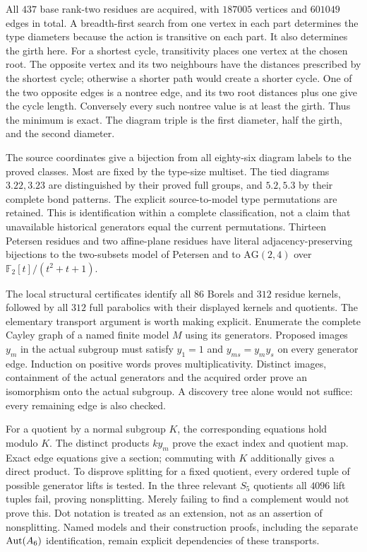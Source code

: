 All $437$ base rank-two residues are acquired, with $187005$ vertices
and $601049$ edges in total. A breadth-first search from one vertex in
each part determines the type diameters because the action is transitive
on each part. It also determines the girth here. For a shortest cycle,
transitivity places one vertex at the chosen root. The opposite vertex
and its two neighbours have the distances prescribed by the shortest
cycle; otherwise a shorter path would create a shorter cycle. One of
the two opposite edges is a nontree edge, and its two root distances
plus one give the cycle length. Conversely every such nontree value
is at least the girth. Thus the minimum is exact. The diagram triple
is the first diameter, half the girth, and the second diameter.

The source coordinates give a bijection from all eighty-six diagram
labels to the proved classes. Most are fixed by the type-size multiset.
The tied diagrams $3.22,3.23$ are distinguished by their proved full
groups, and $5.2,5.3$ by their complete bond patterns. The explicit
source-to-model type permutations are retained. This is identification
within a complete classification, not a claim that unavailable historical
generators equal the current permutations. Thirteen Petersen residues
and two affine-plane residues have literal adjacency-preserving
bijections to the two-subsets model of Petersen and to
$\mathrm{AG}(2,4)$ over $\mathbb F_2[t]/(t^2+t+1)$.

The local structural certificates identify all $86$ Borels and $312$
residue kernels, followed by all $312$ full parabolics with their
displayed kernels and quotients. The elementary transport argument is
worth making explicit. Enumerate the complete Cayley graph of a named
finite model $M$ using its generators. Proposed images $y_m$ in the
actual subgroup must satisfy $y_1=1$ and
$y_{ms}=y_m y_s$ on every generator edge. Induction on positive words
proves multiplicativity. Distinct images, containment of the actual
generators and the acquired order prove an isomorphism onto the actual
subgroup. A discovery tree alone would not suffice: every remaining
edge is also checked.

For a quotient by a normal subgroup $K$, the corresponding equations
hold modulo $K$. The distinct products $k y_m$ prove the exact index
and quotient map. Exact edge equations give a section; commuting with
$K$ additionally gives a direct product. To disprove splitting for a
fixed quotient, every ordered tuple of possible generator lifts is
tested. In the three relevant $S_5$ quotients all $4096$ lift tuples
fail, proving nonsplitting. Merely failing to find a complement would
not prove this. Dot notation is treated as an extension, not as an
assertion of nonsplitting. Named models and their construction proofs,
including the separate $\operatorname{Aut}(A_6)$ identification, remain explicit
dependencies of these transports.

